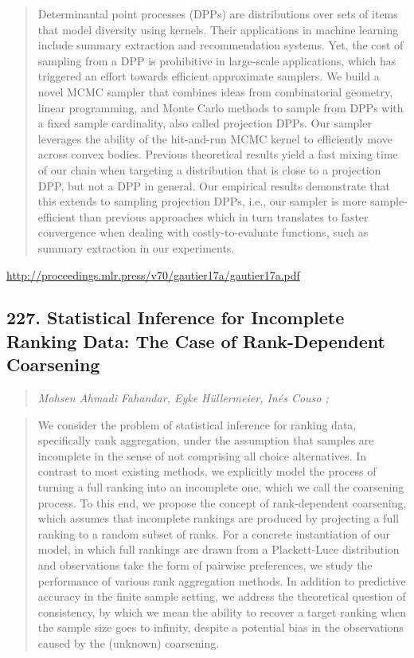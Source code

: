 \documentclass{article}
\begin{document}
\begin{quote}
    Determinantal point processes (DPPs) are distributions over sets of items that model diversity using kernels. Their applications in machine learning include summary extraction and recommendation systems. Yet, the cost of sampling from a DPP is prohibitive in large-scale applications, which has triggered an effort towards efficient approximate samplers. We build a novel MCMC sampler that combines ideas from combinatorial geometry, linear programming, and Monte Carlo methods to sample from DPPs with a fixed sample cardinality, also called projection DPPs. Our sampler leverages the ability of the hit-and-run MCMC kernel to efficiently move across convex bodies. Previous theoretical results yield a fast mixing time of our chain when targeting a distribution that is close to a projection DPP, but not a DPP in general. Our empirical results demonstrate that this extends to sampling projection DPPs, i.e., our sampler is more sample-efficient than previous approaches which in turn translates to faster convergence when dealing with costly-to-evaluate functions, such as summary extraction in our experiments.  \end{quote}

\href{http://proceedings.mlr.press/v70/gautier17a/gautier17a.pdf}{http://proceedings.mlr.press/v70/gautier17a/gautier17a.pdf}

\subsection{227. Statistical Inference for Incomplete Ranking Data: The Case of Rank-Dependent Coarsening}

\begin{quote}
\footnotesize{\textit{Mohsen Ahmadi Fahandar, Eyke Hüllermeier, Inés Couso ;}}
\end{quote}

\begin{quote}
    We consider the problem of statistical inference for ranking data, specifically rank aggregation, under the assumption that samples are incomplete in the sense of not comprising all choice alternatives. In contrast to most existing methods, we explicitly model the process of turning a full ranking into an incomplete one, which we call the coarsening process. To this end, we propose the concept of rank-dependent coarsening, which assumes that incomplete rankings are produced by projecting a full ranking to a random subset of ranks. For a concrete instantiation of our model, in which full rankings are drawn from a Plackett-Luce distribution and observations take the form of pairwise preferences, we study the performance of various rank aggregation methods. In addition to predictive accuracy in the finite sample setting, we address the theoretical question of consistency, by which we mean the ability to recover a target ranking when the sample size goes to infinity, despite a potential bias in the observations caused by the (unknown) coarsening.  \end{quote}
\end{document}
